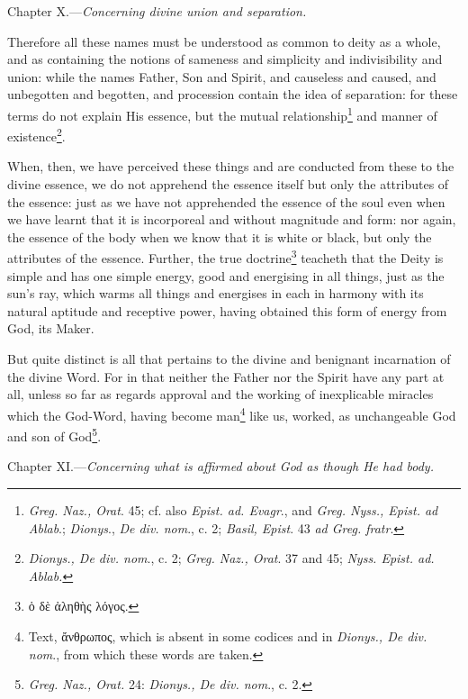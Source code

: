 
Chapter X.—\emph{Concerning divine union and separation.}

Therefore all these names must be understood as common to deity as a whole, and as containing the notions of sameness and simplicity and indivisibility and union: while the names Father, Son and Spirit, and causeless and caused, and unbegotten and begotten, and procession contain the idea of separation: for these terms do not explain His essence, but the mutual relationship\footnote{\emph{Greg. Naz., Orat}. 45; cf. also \emph{Epist. ad. Evagr}., and \emph{Greg. Nyss., Epist. ad Ablab}.; \emph{Dionys}., \emph{De div. nom}., c. 2; \emph{Basil, Epist}. 43 \emph{ad Greg. fratr}.} and manner of existence\footnote{\emph{Dionys., De div. nom}., c. 2; \emph{Greg. Naz., Orat}. 37 and 45; \emph{Nyss. Epist. ad. Ablab.}}.

When, then, we have perceived these things and are conducted from these to the divine essence, we do not apprehend the essence itself but only the attributes of the essence: just as we have not apprehended the essence of the soul even when we have learnt that it is incorporeal and without magnitude and form: nor again, the essence of the body when we know that it is white or black, but only the attributes of the essence. Further, the true doctrine\footnote{\textgreek{ὁ δὲ ἀληθὴς λόγος}.} teacheth that the Deity is simple and has one simple energy, good and energising in all things, just as the sun’s ray, which warms all things and energises in each in harmony with its natural aptitude and receptive power, having obtained this form of energy from God, its Maker.

But quite distinct is all that pertains to the divine and benignant incarnation of the divine Word. For in that neither the Father nor the Spirit have any part at all, unless so far as regards approval and the working of inexplicable miracles which the God-Word, having become man\footnote{Text, \textgreek{ἄνθρωπος}, which is absent in some codices and in \emph{Dionys., De div. nom}., from which these words are taken.} like us, worked, as unchangeable God and son of God\footnote{\emph{Greg. Naz., Orat. }24: \emph{Dionys., De div. nom}., c. 2.}.


Chapter XI.—\emph{Concerning what is affirmed about God as though He had body.}

